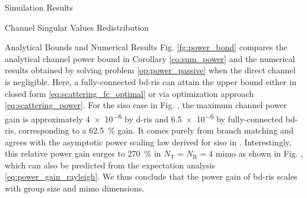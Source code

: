 \documentclass[journal]{IEEEtran}
\begin{document}
\begin{section}{Simulation Results}
\begin{subsection}{Channel Singular Values Redistribution}
\begin{subsubsection}{Analytical Bounds and Numerical Results}
			Fig. \ref{fg:power_bond} compares the analytical channel power bound in Corollary \ref{co:sum_power} and the numerical results obtained by solving problem \eqref{op:power_passive} when the direct channel is negligible.
			Here, a fully-connected \gls{bd}-\gls{ris} can attain the upper bound either in closed form \eqref{eq:scattering_fc_optimal} or via optimization approach \eqref{eq:scattering_power}.
			For the \gls{siso} case in Fig. , the maximum channel power gain is approximately \num{4e-6} by \gls{d}-\gls{ris} and \num{6.5e-6} by fully-connected \gls{bd}-\gls{ris}, corresponding to a \qty{62.5}{\percent} gain.
			It comes purely from branch matching and agrees with the asymptotic power scaling law derived for \gls{siso} in \cite[Equation 30]{Shen2020a}.
			Interestingly, this relative power gain surges to \qty{270}{\percent} in $N_\mathrm{T}=N_\mathrm{R}=4$ \gls{mimo} as shown in Fig. , which can also be predicted from the expectation analysis \eqref{eq:power_gain_rayleigh}.
			We thus conclude that the power gain of \gls{bd}-\gls{ris} scales with group size and \gls{mimo} dimensions.
		\end{subsubsection}

	\end{subsection}


\end{section}
\end{document}
